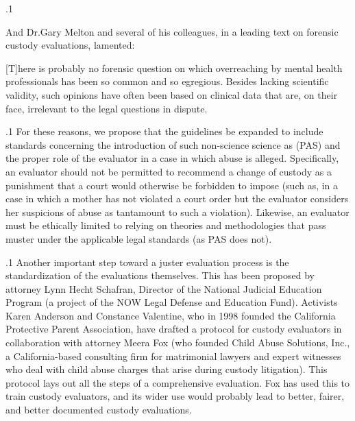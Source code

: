 \documentclass[11pt, twoside]{article}
\begin{document}
{{}%

\p.1{%
And Dr.\@ Gary Melton and several of his colleagues, in a leading text
on forensic custody evaluations, lamented:

\begin{blockQuote}
{[T]}here is probably no forensic question on which overreaching by
mental health professionals has been so common and so egregious.
Besides lacking scientific validity, such opinions have often been
based on clinical data that are, on their face, irrelevant to the legal
questions in dispute.
\end{blockQuote}

}%

\p.1{%
For these reasons, we propose that the guidelines be expanded to
include standards concerning the introduction of such non-science
science as  (PAS) and the proper role
of the evaluator in a case in which abuse is alleged. Specifically, an
evaluator should not be permitted to recommend a change of custody
as a punishment that a court would otherwise be forbidden to impose
(such as, in a case in which a mother has not violated a court order but
the evaluator considers her suspicions of abuse as tantamount to such
a violation). Likewise, an evaluator must be ethically limited to relying
on theories and methodologies that pass muster under the applicable
legal standards (as PAS does not).
}%

\p.1{%
Another important step toward a juster evaluation process is the standardization of the evaluations themselves. This has been proposed by
attorney Lynn Hecht Schafran, Director of the National Judicial Education Program (a project of the NOW Legal Defense and Education
Fund). Activists Karen Anderson and Constance Valentine, who in
1998 founded the California Protective Parent Association, have drafted
a protocol for custody evaluators in collaboration with attorney Meera
Fox (who founded Child Abuse Solutions, Inc., a California-based consulting firm for matrimonial lawyers and expert witnesses who deal with
child abuse charges that arise during custody litigation). This protocol
lays out all the steps of a comprehensive evaluation. Fox has used this to
train custody evaluators, and its wider use would probably lead to better,
fairer, and better documented custody evaluations.
}%

}
\end{document}
